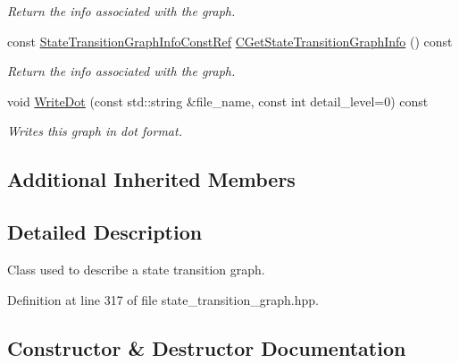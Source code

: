 \begin{DoxyCompactItemize}
\begin{DoxyCompactList}\small\item\em Return the info associated with the graph. \end{DoxyCompactList}\item 
const \hyperlink{state__transition__graph_8hpp_aeebd36a5156ebc171621000ba2c5180d}{State\+Transition\+Graph\+Info\+Const\+Ref} \hyperlink{structStateTransitionGraph_a4b7434612d45f908dbd017de2aa0dc97}{C\+Get\+State\+Transition\+Graph\+Info} () const
\begin{DoxyCompactList}\small\item\em Return the info associated with the graph. \end{DoxyCompactList}\item 
void \hyperlink{structStateTransitionGraph_af5933c5e1580fc618df655dd2c0078e2}{Write\+Dot} (const std\+::string \&file\+\_\+name, const int detail\+\_\+level=0) const
\begin{DoxyCompactList}\small\item\em Writes this graph in dot format. \end{DoxyCompactList}\end{DoxyCompactItemize}
\subsection*{Additional Inherited Members}


\subsection{Detailed Description}
Class used to describe a state transition graph. 

Definition at line 317 of file state\+\_\+transition\+\_\+graph.\+hpp.



\subsection{Constructor \& Destructor Documentation}
\mbox{\label{structStateTransitionGraph_a5e1e81273324c5bd51d8bb3b60213e27}} 

